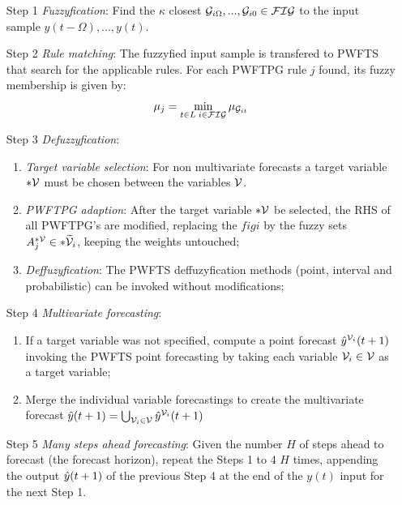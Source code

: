 \begin{enumerate} 
\item [Step 1] \textit{Fuzzyfication}: Find the $\kappa$ closest   $\mathcal{G}_{i\Omega},...,\mathcal{G}_{i0} \in \mathcal{FIG}$ to the input sample $y(t-\Omega),...,y(t)$. 

\item [Step 2] \textit{Rule matching}: The fuzzyfied input sample is transfered to PWFTS that search for the applicable rules. For each PWFTPG rule $j$ found, its fuzzy membership is given by:
\begin{equation}
    \mu_j = \min_{t\in L\; i \in \mathcal{FIG}} \mu_{\mathcal{G}_{it}}
\end{equation}

\item [Step 3] \textit{Defuzzyfication}: 
\begin{enumerate}
    \item \textit{Target variable selection}: For non multivariate forecasts a target variable $*\mathcal{V}$ must be chosen between the variables $\mathcal{V}$.
    \item \textit{PWFTPG adaption}: After the target variable $*\mathcal{V}$ be selected, the RHS of all PWFTPG's are modified, replacing the $figi$ by the fuzzy sets $A_j^{*\mathcal{V}} \in *\widetilde{\mathcal{V}}_i$, keeping the weights untouched;
    \item \textit{Deffuzyfication}: The PWFTS deffuzyfication methods (point, interval and probabilistic) can be invoked without modifications;
\end{enumerate}

\item [Step 4] \textit{Multivariate forecasting}:
\begin{enumerate}
    \item If a target variable was not specified, compute a point forecast $\hat{y}^{\mathcal{V}_i}(t+1)$ invoking the PWFTS point forecasting by taking each variable $\mathcal{V}_i \in \mathcal{V}$ as a target variable;
    \item Merge the individual variable forecastings to create the multivariate forecast $\hat{y}(t+1) = \bigcup_{\mathcal{V}_i \in \mathcal{V}} \hat{y}^{\mathcal{V}_i}(t+1)$ 
\end{enumerate}
 
\item [Step 5] \textit{Many steps ahead forecasting}: Given the number $H$ of steps ahead to forecast  (the forecast horizon), repeat the Steps 1 to 4 $H$ times, appending the output $\hat{y}(t+1)$ of the previous Step 4 at the end of the $y(t)$ input for the next Step 1.
\end{enumerate}

